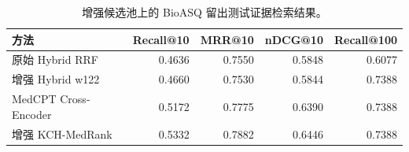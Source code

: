 \begin{table}[t]
\centering
\small
\caption{增强候选池上的 BioASQ 留出测试证据检索结果。}
\label{tab:enhanced-bioasq-main-results}
\begin{tabular}{lrrrr}
\toprule
方法 & Recall@10 & MRR@10 & nDCG@10 & Recall@100 \\
\midrule
原始 Hybrid RRF & 0.4636 & 0.7550 & 0.5848 & 0.6077 \\
增强 Hybrid w122 & 0.4660 & 0.7530 & 0.5844 & 0.7388 \\
MedCPT Cross-Encoder & 0.5172 & 0.7775 & 0.6390 & 0.7388 \\
增强 KCH-MedRank & 0.5332 & 0.7882 & 0.6446 & 0.7388 \\
\bottomrule
\end{tabular}
\end{table}

